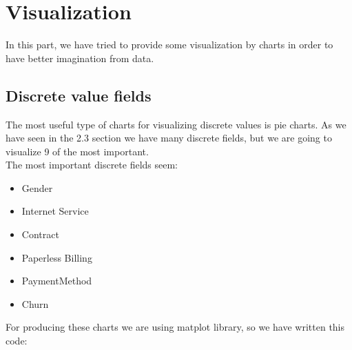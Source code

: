 \documentclass[12pt]{article}
\begin{document}
\section{Visualization}
In this part, we have tried to provide some visualization by charts in order to have better imagination from data.

\subsection{Discrete value fields}
The most useful type of charts for visualizing discrete values is pie charts. As we have seen in the 2.3 section we have many discrete fields, but we are going to visualize 9 of the most important.\\
The most important discrete fields seem:
\begin{itemize}
  \item Gender
  \item Internet Service
  \item Contract
  \item Paperless Billing
  \item PaymentMethod
  \item Churn
\end{itemize}
\vspace{1cm}
For producing these charts we are using matplot library, so we have written this code:
\end{document}
